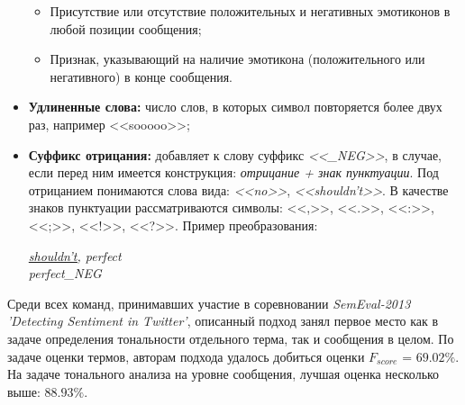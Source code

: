 \begin{itemize}
\begin{itemize}
                \item Присутствие или отсутствие положительных и негативных
                    эмотиконов в любой позиции сообщения;
                \item Признак, указывающий на наличие эмотикона (положительного
                    или негативного) в конце сообщения.
            \end{itemize}
        \item {\bf Удлиненные слова:} число слов, в которых символ повторяется
            более двух раз, например <<sooooo>>;
        \item {\bf Суффикс отрицания:} добавляет к слову суффикс {\it <<\_NEG>>},
            в случае, если перед ним имеется конструкция: {\it отрицание +
            знак пунктуации}.
            Под отрицанием понимаются слова вида: {\it<<no>>}, {\it <<shouldn't>>}.
            В качестве знаков пунктуации рассматриваются символы:
            <<,>>, <<.>>, <<:>>, <<;>>, <<!>>, <<?>>.
            Пример преобразования:
            \begin{center}
                \it
                \underline{shouldn't,} perfect \\
                perfect\_NEG
            \end{center}
    \end{itemize}

    Среди всех команд, принимавших участие в соревновании {\it SemEval-2013 'Detecting
    Sentiment in Twitter'}, описанный подход занял первое место как в задаче
    определения тональности отдельного терма, так и сообщения в целом.
    По задаче оценки термов, авторам подхода удалось добиться оценки
    $F_{score}$ = $69.02\%$. На задаче тонального анализа на уровне сообщения,
    лучшая оценка несколько выше: $88.93\%$.
